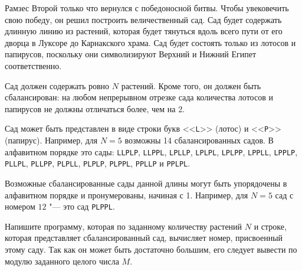 Рамзес Второй только что вернулся с победоносной битвы. Чтобы увековечить свою
победу, он решил построить величественный сад. Сад будет содержать длинную
линию из растений, которая будет тянуться вдоль всего пути от его дворца в
Луксоре до Карнакского храма. Сад будет состоять только из лотосов и папирусов,
поскольку они символизируют Верхний и Нижний Египет соответственно.

Сад должен содержать ровно $N$ растений.
Кроме того, он должен быть сбалансирован: на любом непрерывном отрезке сада
количества лотосов и папирусов не должны отличаться более, чем на 2.

Сад может быть представлен в виде строки букв <<\texttt{L}>> (лотос)
и <<\texttt{P}>> (папирус).
Например, для $N = 5$ возможны 14 сбалансированных садов.
В алфавитном порядке это сады:
\texttt{LLPLP}, \texttt{LLPPL}, \texttt{LPLLP}, \texttt{LPLPL}, \texttt{LPLPP},
\texttt{LPPLL}, \texttt{LPPLP}, \texttt{PLLPL}, \texttt{PLLPP}, \texttt{PLPLL},
\texttt{PLPLP}, \texttt{PLPPL}, \texttt{PPLLP} и \texttt{PPLPL}.

Возможные сбалансированные сады данной длины могут быть упорядочены в алфавитном 
порядке и пронумерованы, начиная с 1. Например, для $N = 5$ сад с номером $12$ "--- это 
сад \texttt{PLPPL}.

Напишите программу, которая по заданному количеству растений $N$ и строке,
которая представляет сбалансированный сад, вычисляет номер,
присвоенный этому саду.
Так как он может быть достаточно большим,
его следует вывести по модулю заданного целого числа $M$.
